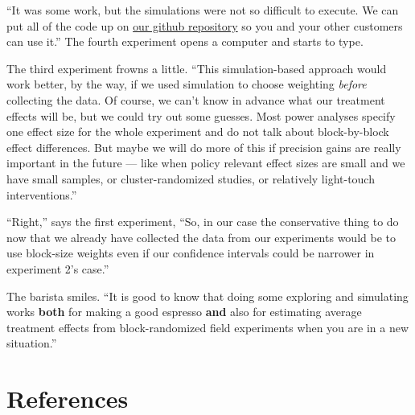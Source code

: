 \documentclass[
]{article}
\begin{document}
``It was some work, but the simulations were not so difficult to execute. We can
put all of the code up on \href{https://github.com/egap/standards_discussions/block_rand}{our github
repository} so you
and your other customers can use it.'' The fourth experiment opens a computer
and starts to type.

The third experiment frowns a little. ``This simulation-based approach would work better, by the
way, if we used simulation to choose weighting \emph{before} collecting the data. Of course, we
can't know in advance what our treatment effects will be, but we could try out some guesses. Most power analyses
specify one effect size for the whole experiment and do not talk about
block-by-block effect differences. But maybe we will do more of this if
precision gains are really important in the future --- like when policy
relevant effect sizes are small and we have small samples, or
cluster-randomized studies, or relatively light-touch interventions.''

``Right,'' says the first experiment, ``So, in our case the conservative thing to
do now that we already have collected the data from our experiments would be to
use block-size weights even if our confidence intervals could be narrower in
experiment 2's case.''

The barista smiles. ``It is good to know that doing some
exploring and simulating works \textbf{both} for making a good espresso \textbf{and} also
for estimating average treatment effects from block-randomized field
experiments when you are in a new situation.''

\hypertarget{references}{%
\section*{References}\label{references}}
\end{document}
